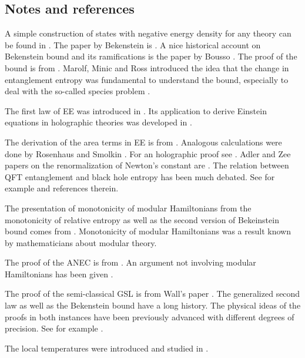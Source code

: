 \documentclass[12pt]{article}
\numberwithin{equation}{section}
\begin{document}
\subsection{Notes and references}
A simple construction of states with negative energy density for any theory can be found in \cite{Witten:2018lha}.  The paper by Bekenstein is \cite{bekenstein1981universal}. A nice historical account on Bekenstein bound and its ramifications is the paper by Bousso \cite{Bousso:2018bli}.
 The proof of the bound is from \cite{Casini:2008cr}. Marolf, Minic and Ross introduced the idea that the change in entanglement entropy was fundamental to understand the bound, especially to deal with the so-called species problem \cite{Marolf:2003sq}. 
 
The first law of EE was introduced in \cite{Blanco:2013joa,Wong:2013gua}. Its application to derive Einstein equations in holographic theories was developed in \cite{Lashkari:2013koa,Faulkner:2013ica}.   

The derivation of the area terms in EE is from \cite{Casini:2014yca}. Analogous calculations were done by Rosenhaus and Smolkin  \cite{Rosenhaus:2014ula}. For an holographic proof see \cite{Casini:2015ffa}. Adler and Zee papers on the renormalization of Newton's constant are \cite{Adler:1982ri,Zee:1980sj}. The relation between QFT entanglement and black hole entropy has been much debated. See for example \cite{Cooperman:2013iqr} and references therein. 

The presentation of monotonicity of modular Hamiltonians from the monotonicity of relative entropy as well as the second version of Bekeinstein bound comes from \cite{Blanco:2013lea}. Monotonicity of modular Hamiltonians was a result known by mathematicians about modular theory.     

The proof of the ANEC is from \cite{Faulkner:2016mzt}. An argument not involving modular Hamiltonians has been given \cite{Hartman:2016lgu}.  
 
The proof of the semi-classical GSL is from Wall's paper \cite{Wall:2011hj}. The generalized second law as well as the Bekenstein bound have a long history. The physical ideas of the proofs in both instances have been previously advanced with different degrees of precision. See for example \cite{Marolf:2003wu,Marolf:2003sq,sorkin1986toward,Sorkin:1997ja,Frolov:1993fy,zurek1985statistical}.

The local temperatures were introduced and studied in \cite{Arias:2016nip,Arias:2017dda}. 
\end{document}
